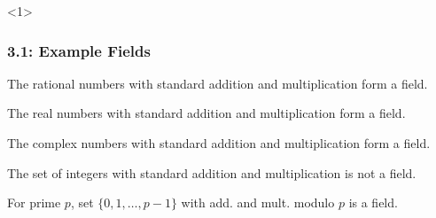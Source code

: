 \documentclass[10pt,english,aspectratio=169]{beamer}
\begin{document}
\begin{frame}<1> \frametitle{3.1: Example Fields}

\begin{example}
The rational numbers with standard addition and multiplication form a field.
\end{example}

\begin{example}
The real numbers with standard addition and multiplication form a field.
\end{example}

\begin{example}
The complex numbers with standard addition and multiplication form a field.
\end{example}

\begin{example}
The set of integers with standard addition and multiplication is not a field.
\end{example}

\begin{example}
For prime $p$, set $\{0,1,\ldots,p-1\}$ with add. and mult. modulo $p$ is a field.
\end{example}


\end{frame}
\end{document}
